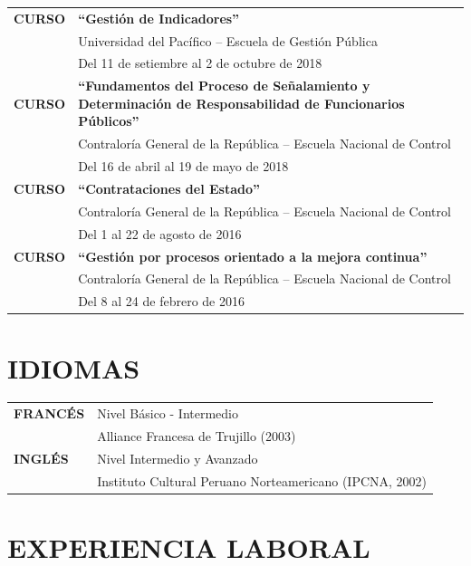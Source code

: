 \documentclass[11pt,a4paper]{article}
\begin{document}
\begin{tabularx}{\textwidth}{@{}l@{\hspace{1em}}X@{}}
\textbf{CURSO} & \textbf{``Gesti\'on de Indicadores''}\\
& Universidad del Pac\'ifico -- Escuela de Gesti\'on P\'ublica\\
& Del 11 de setiembre al 2 de octubre de 2018\\[5pt]

\textbf{CURSO} & \textbf{``Fundamentos del Proceso de Se\~nalamiento y Determinaci\'on de Responsabilidad de Funcionarios P\'ublicos''}\\
& Contralor\'ia General de la Rep\'ublica -- Escuela Nacional de Control\\
& Del 16 de abril al 19 de mayo de 2018\\[5pt]

\textbf{CURSO} & \textbf{``Contrataciones del Estado''}\\
& Contralor\'ia General de la Rep\'ublica -- Escuela Nacional de Control\\
& Del 1 al 22 de agosto de 2016\\[5pt]

\textbf{CURSO} & \textbf{``Gesti\'on por procesos orientado a la mejora continua''}\\
& Contralor\'ia General de la Rep\'ublica -- Escuela Nacional de Control\\
& Del 8 al 24 de febrero de 2016\\
\end{tabularx}

\section{IDIOMAS}

\noindent
\begin{tabularx}{\textwidth}{@{}l@{\hspace{1.5em}}X@{}}
\textbf{FRANC\'ES} & Nivel B\'asico - Intermedio\\
& Alliance Francesa de Trujillo (2003)\\[4pt]
\textbf{INGL\'ES} & Nivel Intermedio y Avanzado\\
& Instituto Cultural Peruano Norteamericano (IPCNA, 2002)\\
\end{tabularx}

\section{EXPERIENCIA LABORAL}
\end{document}
